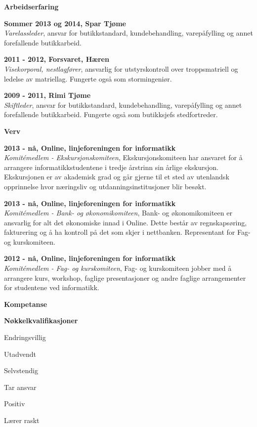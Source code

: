 \documentclass[a4paper,12pt,final]{memoir}
\newcommand{\Sep}{\vspace{1.5em}}
\newcommand{\SmallSep}{\vspace{0.5em}}
\newcommand{\CVSection}[1]
	{\Large\textbf{#1}\par
	\SmallSep\normalsize\normalfont}
\newcommand{\CVItem}[1]
	{\textbf{\color{RoyalBlue} #1}}
\begin{document}
\CVSection{Arbeidserfaring}
\CVItem{Sommer 2013 og 2014, Spar Tjøme}\\
\textit{Varelassleder}, ansvar for butikkstandard, kundebehandling, varepåfylling og annet forefallende butikkarbeid.
\SmallSep

\CVItem{2011 - 2012, Forsvaret, Hæren}\\
\textit{Visekorporal, nestlagfører}, ansvarlig for utstyrskontroll over troppsmatriell og ledelse av matriellag. Fungerte også som stormingeniør.
\SmallSep

\CVItem{2009 - 2011, Rimi Tjøme}\\
\textit{Skiftleder}, ansvar for butikkstandard, kundebehandling, varepåfylling og annet forefallende butikkarbeid. Fungerte også som butikksjefs stedfortreder.
\Sep

\CVSection{Verv}
\CVItem{2013 - nå, Online, linjeforeningen for informatikk}\\
\textit{Komitémedlem - Ekskursjonskomiteen}, Ekskursjonskomiteen har ansvaret for å arrangere informatikkstudentene i tredje årstrinn sin årlige ekskursjon. Ekskursjonen er av akademisk grad og går gjerne til et sted av utenlandsk opprinnelse hvor næringsliv og utdanningsinstitusjoner blir besøkt.
\SmallSep

\CVItem{2013 - nå, Online, linjeforeningen for informatikk}\\
\textit{Komitémedlem - Bank- og økonomikomiteen}, Bank- og økonomikomiteen er ansvarlig for alt det økonomiske innad i Online. Dette består av regnskapsøring, fakturering og å ha kontroll på det som skjer i nettbanken. Representant for Fag- og kurskomiteen.
\SmallSep

\CVItem{2012 - nå, Online, linjeforeningen for informatikk}\\
\textit{Komitémedlem - Fag- og kurskomiteen}, Fag- og kurskomiteen jobber med å arrangere kurs, workshop, faglige presentasjoner og andre faglige arrangementer for studentene ved informatikk.
\Sep

\clearpage
\framebreak
\framebreak

\CVSection{Kompetanse}

\CVItem{Nøkkelkvalifikasjoner}
\begin{multicols}{3}
\begin{compactitem}[\color{RoyalBlue}$\circ$]
    \item Endringsvillig 
    \item Utadvendt
    \item Selvstendig
    \item Tar ansvar
    \item Positiv
    \item Lærer raskt
\end{compactitem}
\end{multicols}
\SmallSep
\end{document}
